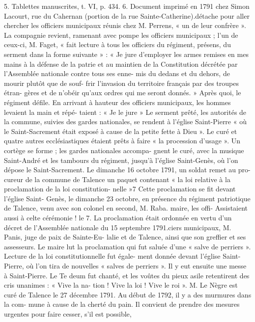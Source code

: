 \documentclass[a4paper,11pt]{book}
\begin{document}
5. Tablettes manuscrites, t. VI, p. 434.
6. Document imprimé en 1791 chez Simon Lacourt, rue du Cahernan
(portion de la rue Sainte-Catherine).détache pour aller chercher les officiers municipaux réunis
chez M. Perrens, « un de leur confrère ». La compagnie
revient, ramenant avec pompe les officiers municipaux ;
l'un de ceux-ci, M. Faget, « fait lecture à tous les officiers
du régiment, présens, du serment dans la forme suivante » :
« Je jure d'employer les armes remises en mes mains
à la défense de la patrie et au maintien de la Constitution
décrétée par l'Assemblée nationale contre tous ses enne-
mis du dedans et du dehors, de mourir plutôt que de souf-
frir l'invasion du territoire français par des troupes étran-
gères et de n'obéir qu'aux ordres qui me seront donnés. »
Après quoi, le régiment défile. En arrivant à hauteur des
officiers municipaux, les hommes levaient la main et répé-
taient : « Je le jure »
Le serment prêté, les autorités de la commune, suivies
des gardes nationales, se rendent à l'église Saint-Pierre
« où le Saint-Sacrement était exposé à cause de la petite
fette à Dieu ». Le curé et quatre autres ecclésiastiques
étaient prêts à faire « la procession d'usage ».
Un cortège se forme ; les gardes nationales accompa-
gnent le curé, avec la musique Saint-André et les tambours
du régiment, jusqu'à l'église Saint-Genès, où l'on dépose
le Saint-Sacrement.
Le dimanche 16 octobre 1791, un soldat remet au pro-
cureur de la commune de Talence un paquet contenant
« la loi relative à la proclamation de la loi constitution-
nelle »7 Cette proclamation se fit devant l'église Saint-
Genès, le dimanche 23 octobre, en présence du régiment
patriotique de Talence, venu avec son colonel en second,
M. Raba.
maire, les offi-
Assistaient aussi à celte cérémonie
!
le
7. La proclamation était ordonnée en vertu d'un décret de l'Assemblée
nationale du 15 septembre 1791.ciers municipaux, M. Panis, juge de paix de Sainte-Eu-
lalie et de Talence, ainsi que son greffier et ses assesseurs.
Le maire lut la proclamation qui fut saluée d'une « salve
de perriers ». Lecture de la loi constitutionnelle fut égale-
ment donnée devant l'église Saint-Pierre, où l'on tira de
nouvelles « salves de perriers ». Il y eut ensuite une messe
à Saint-Pierre. Le Te deum fut chanté, et les voûtes du
pieux asile retentirent des cris unanimes : « Vive la na-
tion ! Vive la loi ! Vive le roi ».
M. Le Nègre est curé de Talence le 27 décembre 1791.
Au début de 1792, il y a des murmures dans la com-
mune à cause de la cherté du pain. Il convient de prendre
des mesures urgentes pour faire cesser, s'il est possible,
\end{document}
